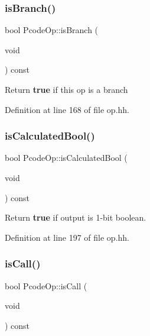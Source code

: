 \subsubsection{\texorpdfstring{isBranch()}{isBranch()}}
{\footnotesize\ttfamily bool Pcode\+Op\+::is\+Branch (\begin{DoxyParamCaption}\item[{void}]{ }\end{DoxyParamCaption}) const\hspace{0.3cm}{\ttfamily [inline]}}

Return {\bfseries{true}} if this op is a branch 

Definition at line 168 of file op.\+hh.

\mbox{\label{class_pcode_op_a8ed2d631209bc616d0cccf20e2f2577a}} 
\subsubsection{\texorpdfstring{isCalculatedBool()}{isCalculatedBool()}}
{\footnotesize\ttfamily bool Pcode\+Op\+::is\+Calculated\+Bool (\begin{DoxyParamCaption}\item[{void}]{ }\end{DoxyParamCaption}) const\hspace{0.3cm}{\ttfamily [inline]}}



Return {\bfseries{true}} if output is 1-\/bit boolean. 



Definition at line 197 of file op.\+hh.

\mbox{\label{class_pcode_op_a3dabd80d764bec27a069d40b3bac3c9d}} 
\subsubsection{\texorpdfstring{isCall()}{isCall()}}
{\footnotesize\ttfamily bool Pcode\+Op\+::is\+Call (\begin{DoxyParamCaption}\item[{void}]{ }\end{DoxyParamCaption}) const\hspace{0.3cm}{\ttfamily [inline]}}



